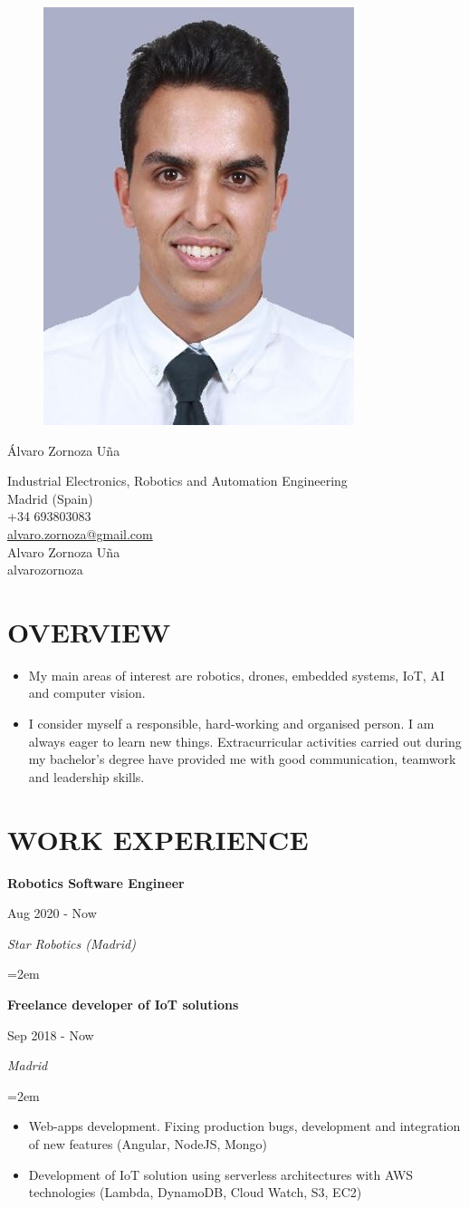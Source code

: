 \documentclass[10pt,a4paper,oneside]{book}
\newcommand{\sepspace}{\vspace*{0pt}}		%
\newcommand{\MyName}[1]{ %
		\Huge \usefont{OT1}{phv}{b}{n} \hfill #1
		\par \normalsize \normalfont}
\newcommand{\MySlogan}[1]{ %
		\large 
		\hfill #1
		\par \normalsize \normalfont}
\newcommand{\NewPart}[2]{\section*{\uppercase{#1} #2}}
\newcommand{\EducationEntrya}[4]{\noindent\ignorespaces	
		\begin{minipage}[t][][b]{0.8\textwidth} \raggedright{\textbf{#1}} \end{minipage} \hfill 
		\begin{minipage}[t][][b]{0.2\textwidth} \hfill\color{Black}#2\end{minipage} 
		 
		\noindent \textit{#3} \par        %
		\noindent\hangindent=2em\hangafter=0 \small #4 
		\normalsize \par}
\begin{document}

\begin{figure}
	\vspace*{-2em}
		\includegraphics[width=.19\textwidth]{Assets/picture.JPG}
\end{figure}

\MyName{Álvaro Zornoza Uña}
\MySlogan{\vspace{-0.15in}\begin{flushright} 
\hfill Industrial Electronics, Robotics and Automation Engineering \\ Madrid (Spain) \\ +34 693803083 \\ 
\href{mailto:alvaro.zornoza@gmail.com}{alvaro.zornoza@gmail.com} \\ \href{https://www.linkedin.com/in/alvaro-zornoza/}{ \faLinkedin} Alvaro Zornoza Uña \\ \href{https://github.com/alvarozornoza}{ \faGithub} alvarozornoza \\ 
\end{flushright}}

\vspace{0.01in}
\sepspace
 \NewPart{Overview}{}
 
 \begin{itemize}
 \item My main areas of interest are robotics, drones, embedded systems, IoT, AI and computer vision.
 \item I consider myself a responsible, hard-working and organised person. I am always eager to learn new things. Extracurricular activities carried out during my bachelor's degree have provided me with good communication, teamwork and leadership skills.
 \end{itemize}

\NewPart{Work Experience}{}

\EducationEntrya{Robotics Software Engineer}{Aug 2020 - Now}{Star Robotics (Madrid)}{}
\sepspace

\EducationEntrya{Freelance developer of IoT solutions}{Sep 2018 - Now}{Madrid}{\begin{itemize}
\item Web-apps development. Fixing production bugs, development and integration of new features (Angular, NodeJS, Mongo)
\item Development of IoT solution using serverless architectures with AWS technologies (Lambda, DynamoDB, Cloud Watch, S3, EC2)
\end{itemize}}
\sepspace
\end{document}
